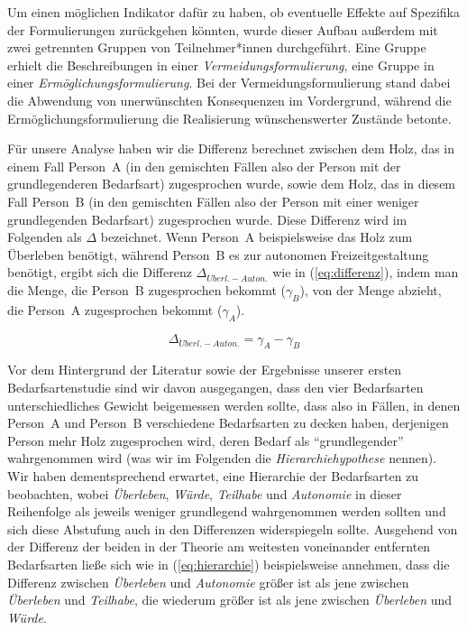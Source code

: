 \documentclass[justified,nobib,nohyper,symmetric,twoside]{tufte-book}
\begin{document}
Um einen möglichen Indikator dafür zu haben, ob eventuelle Effekte auf Spezifika der Formulierungen zurückgehen könnten, wurde dieser Aufbau außerdem mit zwei getrennten Gruppen von Teilnehmer*innen durchgeführt.
Eine Gruppe erhielt die Beschreibungen in einer \textit{Vermeidungsformulierung}, eine Gruppe in einer \textit{Ermöglichungsformulierung}.
Bei der Vermeidungsformulierung stand dabei die Abwendung von unerwünschten Konsequenzen im Vordergrund, während die Ermöglichungsformulierung die Realisierung wünschenswerter Zustände betonte.

Für unsere Analyse haben wir die Differenz berechnet zwischen dem Holz, das in einem Fall Person~A (in den gemischten Fällen also der Person mit der grundlegenderen Bedarfsart) zugesprochen wurde, sowie dem Holz, das in diesem Fall Person~B (in den gemischten Fällen also der Person mit einer weniger grundlegenden Bedarfsart) zugesprochen wurde.
Diese Differenz wird im Folgenden als $\Delta$ bezeichnet.
Wenn Person~A beispielsweise das Holz zum Überleben benötigt, während Person~B es zur autonomen Freizeitgestaltung benötigt, ergibt sich die Differenz $\Delta_{\ddot{U}berl.-Auton.}$  wie in (\ref{eq:differenz}), indem man die Menge, die Person~B zugesprochen bekommt ($\gamma_{B}$), von der Menge abzieht, die Person~A zugesprochen bekommt ($\gamma_{A}$).

\begin{equation}\label{eq:differenz}
   \Delta_{\ddot{U}berl.-Auton.}=\gamma_{A}-\gamma_{B}
\end{equation}

Vor dem Hintergrund der Literatur sowie der Ergebnisse unserer ersten Bedarfsartenstudie sind wir davon ausgegangen, dass den vier Bedarfsarten unterschiedliches Gewicht beigemessen werden sollte, dass also in Fällen, in denen Person~A und Person~B verschiedene Bedarfsarten zu decken haben, derjenigen Person mehr Holz zugesprochen wird, deren Bedarf als \enquote{grundlegender} wahrgenommen wird (was wir im Folgenden die \textit{Hierarchiehypothese} nennen).
Wir haben dementsprechend erwartet, eine Hierarchie der Bedarfsarten zu beobachten, wobei \textit{Überleben}, \textit{Würde}, \textit{Teilhabe} und \textit{Autonomie} in dieser Reihenfolge als jeweils weniger grundlegend wahrgenommen werden sollten und sich diese Abstufung auch in den Differenzen widerspiegeln sollte.
Ausgehend von der Differenz der beiden in der Theorie am weitesten voneinander entfernten Bedarfsarten ließe sich wie in (\ref{eq:hierarchie}) beispielsweise annehmen, dass die Differenz zwischen \textit{Überleben} und \textit{Autonomie} größer ist als jene zwischen \textit{Überleben} und \textit{Teilhabe}, die wiederum größer ist als jene zwischen \textit{Überleben} und \textit{Würde}.
\end{document}
